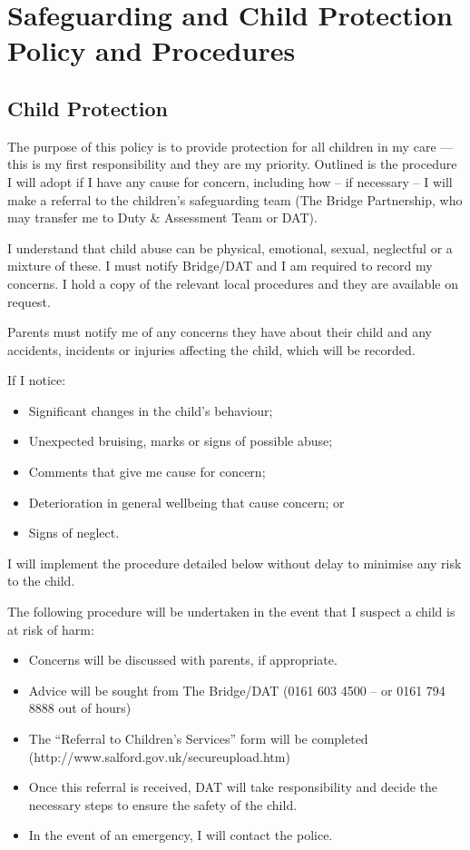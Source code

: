 

\section{Safeguarding and Child Protection Policy and Procedures}

\subsection{Child Protection}

The purpose of this policy is to provide protection for all children in
my care --- this is my first responsibility and they are my priority.
Outlined is the procedure I will adopt if I have any cause for concern,
including how -- if necessary -- I will make a referral to the
children's safeguarding team (The Bridge Partnership, who may transfer me
to Duty \& Assessment Team or DAT).

I understand that child abuse can be physical, emotional, sexual,
neglectful or a mixture of these. I must notify Bridge/DAT and I am required
to record my concerns. I hold a copy of the relevant local procedures
and they are available on request.

Parents must notify me of any concerns they have about their child and
any accidents, incidents or injuries affecting the child, which will be
recorded.

If I notice:
\begin{itemize}[topsep=0pt]
\item
  Significant changes in the child's behaviour;
\item
  Unexpected bruising, marks or signs of possible abuse;
\item
  Comments that give me cause for concern;
\item
  Deterioration in general wellbeing that cause concern; or
\item
  Signs of neglect.
\end{itemize}

I will implement the procedure detailed below without delay to minimise
any risk to the child.

The following procedure will be undertaken in the event that I suspect a
child is at risk of harm:
\begin{itemize}[topsep=0pt]
\item
  Concerns will be discussed with parents, if appropriate.
\item
  Advice will be sought from The Bridge/DAT (0161 603 4500 -- or 0161 794 8888
  out of hours)
\item
  The ``Referral to Children's Services'' form will be completed
  (http://www.salford.gov.uk/secureupload.htm)
\item
  Once this referral is received, DAT will take responsibility and 
  decide the necessary steps to ensure the safety of the child.
\item
  In the event of an emergency, I will contact the police.
\end{itemize}


